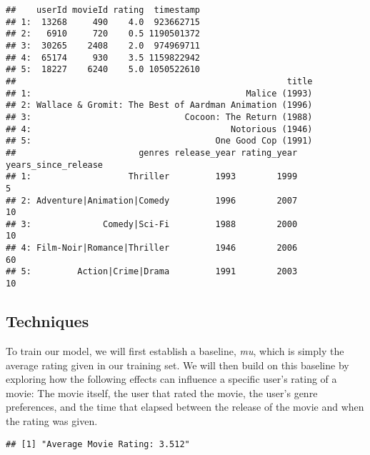 \documentclass[
]{article}
\newenvironment{Shaded}{\begin{snugshade}}{\end{snugshade}}
\newcommand{\DecValTok}[1]{\textcolor[rgb]{0.00,0.00,0.81}{#1}}
\newcommand{\KeywordTok}[1]{\textcolor[rgb]{0.13,0.29,0.53}{\textbf{#1}}}
\newcommand{\NormalTok}[1]{#1}
\newcommand{\OperatorTok}[1]{\textcolor[rgb]{0.81,0.36,0.00}{\textbf{#1}}}
\newcommand{\StringTok}[1]{\textcolor[rgb]{0.31,0.60,0.02}{#1}}
\begin{document}
\begin{verbatim}
##    userId movieId rating  timestamp
## 1:  13268     490    4.0  923662715
## 2:   6910     720    0.5 1190501372
## 3:  30265    2408    2.0  974969711
## 4:  65174     930    3.5 1159822942
## 5:  18227    6240    5.0 1050522610
##                                                     title
## 1:                                          Malice (1993)
## 2: Wallace & Gromit: The Best of Aardman Animation (1996)
## 3:                              Cocoon: The Return (1988)
## 4:                                       Notorious (1946)
## 5:                                    One Good Cop (1991)
##                        genres release_year rating_year years_since_release
## 1:                   Thriller         1993        1999                   5
## 2: Adventure|Animation|Comedy         1996        2007                  10
## 3:              Comedy|Sci-Fi         1988        2000                  10
## 4: Film-Noir|Romance|Thriller         1946        2006                  60
## 5:         Action|Crime|Drama         1991        2003                  10
\end{verbatim}

\hypertarget{techniques}{%
\subsection{Techniques}\label{techniques}}

To train our model, we will first establish a baseline, \emph{mu}, which
is simply the average rating given in our training set. We will then
build on this baseline by exploring how the following effects can
influence a specific user's rating of a movie: The movie itself, the
user that rated the movie, the user's genre preferences, and the time
that elapsed between the release of the movie and when the rating was
given.

\begin{Shaded}
\end{Shaded}

\begin{verbatim}
## [1] "Average Movie Rating: 3.512"
\end{verbatim}
\end{document}
